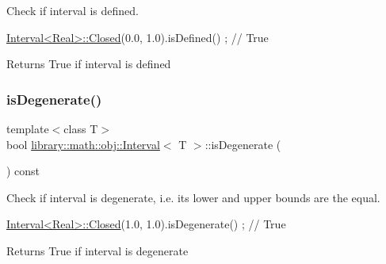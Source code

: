 Check if interval is defined. 


\begin{DoxyCode}
\hyperlink{classlibrary_1_1math_1_1obj_1_1_interval_aae8bb2b89af450729338d48563def4d7}{Interval<Real>::Closed}(0.0, 1.0).isDefined() ; \textcolor{comment}{// True}
\end{DoxyCode}


\begin{DoxyReturn}{Returns}
True if interval is defined 
\end{DoxyReturn}
\mbox{\label{classlibrary_1_1math_1_1obj_1_1_interval_a0e9997639f0c415f4f7fe8dcb58e13a8}} 
\subsubsection{\texorpdfstring{is\+Degenerate()}{isDegenerate()}}
{\footnotesize\ttfamily template$<$class T$>$ \\
bool \hyperlink{classlibrary_1_1math_1_1obj_1_1_interval}{library\+::math\+::obj\+::\+Interval}$<$ T $>$\+::is\+Degenerate (\begin{DoxyParamCaption}{ }\end{DoxyParamCaption}) const}



Check if interval is degenerate, i.\+e. its lower and upper bounds are the equal. 


\begin{DoxyCode}
\hyperlink{classlibrary_1_1math_1_1obj_1_1_interval_aae8bb2b89af450729338d48563def4d7}{Interval<Real>::Closed}(1.0, 1.0).isDegenerate() ; \textcolor{comment}{// True}
\end{DoxyCode}


\begin{DoxyReturn}{Returns}
True if interval is degenerate 
\end{DoxyReturn}
\mbox{\label{classlibrary_1_1math_1_1obj_1_1_interval_a5c02f1b4c3a6913a2eb0893d5c3b9925}} 
